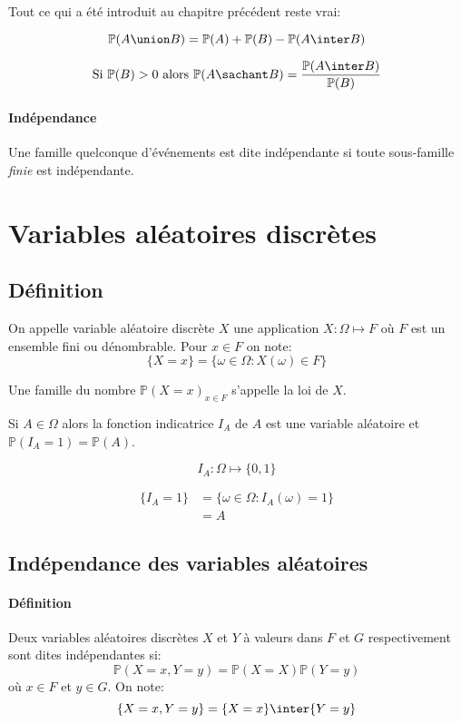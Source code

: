 \documentclass[a4paper,10pt,french,openany]{memoir}
\newcommand{\Proba}{\mathbb{P}}
\begin{document}
Tout ce qui a été introduit au chapitre précédent reste vrai:

\[ \Proba(A \union B) = \Proba(A) + \Proba(B) - \Proba(A \inter B) \]

\[ \text{Si } \Proba(B) > 0 \text{ alors } \Proba(A \sachant B) = \frac{\Proba(A \inter B)}{\Proba(B)} \]

\paragraph{Indépendance}
Une famille quelconque d'événements est dite indépendante si toute sous-famille \emph{finie} est indépendante.

\section{Variables aléatoires discrètes}

\subsection{Définition}
On appelle variable aléatoire discrète $X$ une application $X: \Omega \mapsto F$ où $F$ est un ensemble fini ou dénombrable. Pour $x \in F$ on note:
\[ \{X=x\} = \{\omega \in \Omega: X(\omega) \in F\} \]

Une famille du nombre $\Proba(X=x)_{x \in F}$ s'appelle la loi de $X$.

Si $A \in \Omega$ alors la fonction indicatrice $I_A$ de $A$ est une variable aléatoire et $\Proba(I_A = 1) = \Proba(A)$.

\[I_A : \Omega \mapsto \{0,1\}\]

\begin{align*}
 \{I_A=1\} &= \{\omega \in \Omega: I_A(\omega)=1\}\\
           &= A
\end{align*}

\subsection{Indépendance des variables aléatoires}

\paragraph{Définition}
Deux variables aléatoires discrètes $X$ et $Y$ à valeurs dans $F$ et $G$ respectivement sont dites indépendantes si:
\[ \Proba(X=x, Y=y)=\Proba(X=X) \Proba(Y=y) \]
où $x\in F$ et $y \in G$. On note:
\[ \{X=x, Y=y\}=\{X=x\}\inter\{Y=y\} \]
\end{document}
